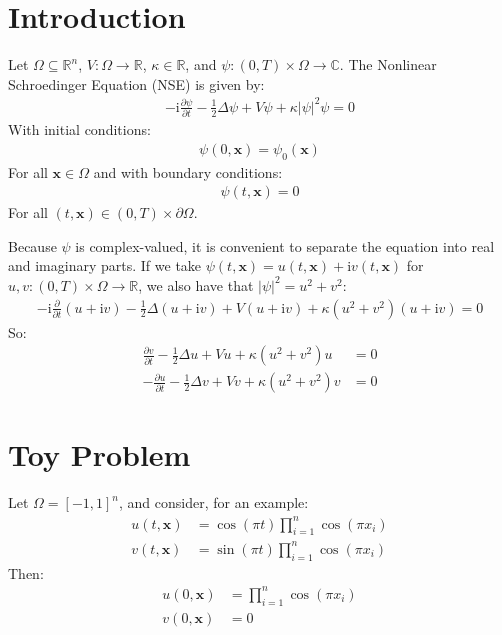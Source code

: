 \documentclass{article}
\newcommand{\bvec}[1]{\boldsymbol{#1}}
\newcommand{\ii}{\mathrm{i}}
\begin{document}
\section{Introduction}

Let $\Omega \subseteq \mathbb{R}^n$,
$V : \Omega \rightarrow \mathbb{R}$,
$\kappa \in \mathbb{R}$,
and $\psi : (0, T) \times \Omega \rightarrow \mathbb{C}$.
The Nonlinear Schroedinger Equation (NSE) is given by:
\begin{align*}
-\ii \frac{\partial \psi}{\partial t} - \frac{1}{2} \Delta \psi + V \psi + \kappa |\psi|^2 \psi = 0
\end{align*}
\noindent With initial conditions:
\begin{align*}
\psi(0, \bvec{x}) = \psi_0(\bvec{x})
\end{align*}
\noindent For all $\bvec{x} \in \Omega$ and with boundary conditions:
\begin{align*}
\psi(t, \bvec{x}) = 0
\end{align*}
\noindent For all $(t, \bvec{x}) \in (0, T) \times \partial \Omega$.

Because $\psi$ is complex-valued, it is convenient to separate the equation into real and imaginary parts.
If we take $\psi(t, \bvec{x}) = u(t, \bvec{x}) + \ii v(t, \bvec{x})$
for $u, v : (0, T) \times \Omega \rightarrow \mathbb{R}$,
we also have that $|\psi|^2 = u^2 + v^2$:
\begin{align*}
    -\ii \frac{\partial}{\partial t} (u + \ii v) - \frac{1}{2} \Delta (u + \ii v)
            + V (u + \ii v) + \kappa (u^2 + v^2) (u + \ii v)
        = 0
\end{align*}
\noindent So:
\begin{align*}
    \frac{\partial v}{\partial t} - \frac{1}{2} \Delta u + V u + \kappa (u^2 + v^2) u & = 0 \\
    -\frac{\partial u}{\partial t} - \frac{1}{2} \Delta v + V v + \kappa (u^2 + v^2) v & = 0
\end{align*}

\newpage

\section{Toy Problem}

Let $\Omega = [-1, 1]^n$, and consider, for an example:
\begin{align*}
    u(t, \bvec{x}) & = \cos(\pi t) \prod_{i = 1}^n \cos(\pi x_i) \\
    v(t, \bvec{x}) & = \sin(\pi t) \prod_{i = 1}^n \cos(\pi x_i)
\end{align*}
\noindent Then:
\begin{align*}
    u(0, \bvec{x}) & = \prod_{i = 1}^n \cos(\pi x_i) \\
    v(0, \bvec{x}) & = 0
\end{align*}
\end{document}
